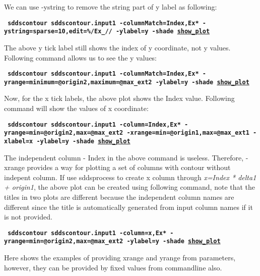\begin{itemize}
\begin{itemize}
        We can use -ystring to remove the string part of y label as following:
        \begin{flushleft}{\tt \bf
            sddscontour sddscontour.input1 -columnMatch=Index,Ex* -ystring=sparse=10,edit=\%/Ex\_// -ylabel=y -shade    \href{http://ops.aps.anl.gov/manuals/example_files/sddscontour2_img.html}{show\_plot}
        }\end{flushleft}

        The above y tick label still shows the index of y coordinate, not y values. Following command allows us to see the y values:
        \begin{flushleft}{\tt \bf
            sddscontour sddscontour.input1 -columnMatch=Index,Ex* -yrange=minimum=@origin2,maximum=@max\_ext2 -ylabel=y -shade          \href{http://ops.aps.anl.gov/manuals/example_files/sddscontour3_img.html}{show\_plot}
        }\end{flushleft}

        Now, for the x tick labels, the above plot shows the Index value. Following command will show the values of x coordinate:
    
        \begin{flushleft}{\tt \bf
        sddscontour sddscontour.input1 -column=Index,Ex* -yrange=min=@origin2,max=@max\_ext2 -xrange=min=@origin1,max=@max\_ext1 -xlabel=x -ylabel=y  -shade   \href{http://ops.aps.anl.gov/manuals/example_files/sddscontour4_img.html}{show\_plot}
        }\end{flushleft}  
        
        The independent column - Index in the above command is useless. Therefore, -xrange provides a way for plotting a set of columns with contour without indepent column. If use sddsprocess to create x column through {\em x=Index * delta1 + origin1}, the above plot can be created using following command, note that the titles in two plots are different because the independent column names are different since the title is automatically generated from input column names if it is not provided.

        \begin{flushleft}{\tt \bf
        sddscontour sddscontour.input1 -column=x,Ex* -yrange=min=@origin2,max=@max\_ext2 -ylabel=y -shade   \href{http://ops.aps.anl.gov/manuals/example_files/sddscontour5_img.html}{show\_plot}
        }\end{flushleft}  


       Here shows the examples of providing xrange and yrange from parameters, however, they can be provided by fixed values from commandline also.


\end{itemize}
\end{itemize}
